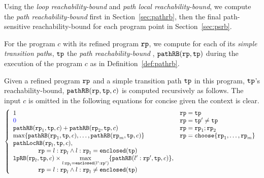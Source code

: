 Using the \emph{loop reachability-bound} and \emph{path local reachability-bound}, we compute the \emph{path reachability-bound} first in Section~\ref{sec:pathrb}, 
then the final path-sensitive reachability-bound for each program point in Section~\ref{sec:psrb}.

For the program $c$ with its refined program $\mathtt{rp}$, we compute
for each of its \emph{simple transition path}s, $\mathtt{tp}$ the \emph{path reachability-bound} , $\mathtt{pathRB}(\mathtt{rp}, \mathtt{tp})$ during the execution of the program $c$ as in Definition~\ref{def:pathrb}.
%
\begin{defn}
  \label{def:pathrb}
  Given a refined program $\mathtt{rp}$ and a simple transition path $\mathtt{tp}$ in this program, 
  $\mathtt{tp}$'s reachability-bound, $\mathtt{pathRB}(\mathtt{rp}, \mathtt{tp}, c)$
  is computed recursively as follows. 
  The input $c$ is omitted in the following equations for concise given the context is clear.
  \[
    \left\{ 
    \begin{array}{ll}
      1  & \rprog = \tpath\\
      \highlight{0} & \rprog = \tpath' \neq \tpath\\
      \inoutB(\rprog_1, \tpath, c) + \inoutB(\rprog_2, \tpath, c) & \rprog = \rprog_1;\rprog_2 \\
      \max\left\{ \inoutB(\rprog_1, \tpath, c), \ldots, \inoutB(\rprog_m, \tpath, c) \right\} 
      & \rprog = \rpchoose{\rprog_1, \ldots, \rprog_m } \\
      \outinB(\rprog_l, \tpath, c), & \\
      \qquad \qquad  \rprog = l: \rprog_l \land l: \rprog_l  = \kw{enclosed}(\tpath) \\
      \lpchB(\rprog_l, \tpath , c)
      \times \max\limits_{l:\rprog_l = \kw{enclosed}(l':\rprog')}
     \{\inoutB(l':\rprog', \tpath, c)\}, & \\
     \qquad \qquad \rprog = l: \rprog_l \land l: \rprog_l \neq \kw{enclosed}(\tpath) \\
    \end{array}
    \right.
    \]
  \end{defn}
%

